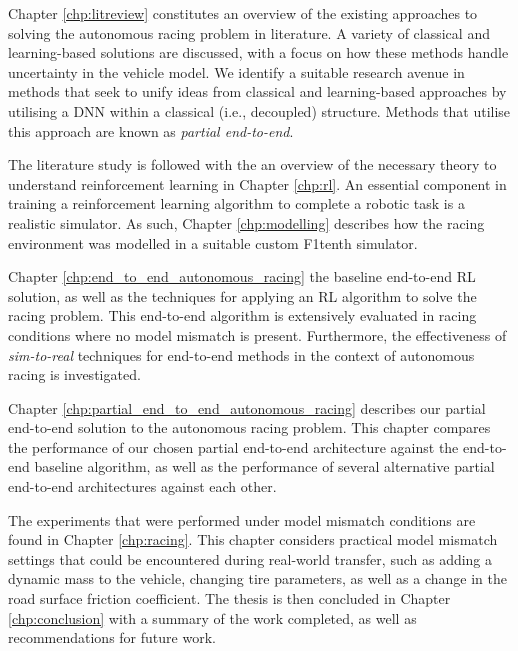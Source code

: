 Chapter \ref{chp:litreview} constitutes an overview of the existing approaches to solving the autonomous racing problem in literature.
A variety of classical and learning-based solutions are discussed, with a focus on how these methods handle uncertainty in the vehicle model.
We identify a suitable research avenue in methods that seek to unify ideas from classical and learning-based approaches by utilising a DNN within a classical (i.e., decoupled) structure.
Methods that utilise this approach are known as \emph{partial end-to-end}.

The literature study is followed with the an overview of the necessary theory to understand reinforcement learning in Chapter \ref{chp:rl}.
An essential component in training a reinforcement learning algorithm to complete a robotic task is a realistic simulator.
As such, Chapter \ref{chp:modelling} describes how the racing environment was modelled in a suitable custom F1tenth simulator.

Chapter \ref{chp:end_to_end_autonomous_racing} the baseline end-to-end RL solution, as well as the techniques for applying an RL algorithm to solve the racing problem.
This end-to-end algorithm is extensively evaluated in racing conditions where no model mismatch is present.
Furthermore, the effectiveness of \emph{sim-to-real} techniques for end-to-end methods in the context of autonomous racing is investigated.

Chapter \ref{chp:partial_end_to_end_autonomous_racing} describes our partial end-to-end solution to the autonomous racing problem.
This chapter compares the performance of our chosen partial end-to-end architecture against the end-to-end baseline algorithm, 
as well as the performance of several alternative partial end-to-end architectures against each other.

The experiments that were performed under model mismatch conditions are found in Chapter \ref{chp:racing}.
This chapter considers practical model mismatch settings that could be encountered during real-world transfer, such as adding a dynamic mass to the vehicle, 
changing tire parameters, as well as a change in the road surface friction coefficient.
The thesis is then concluded in Chapter \ref{chp:conclusion} with a summary of the work completed, as well as recommendations for future work.
